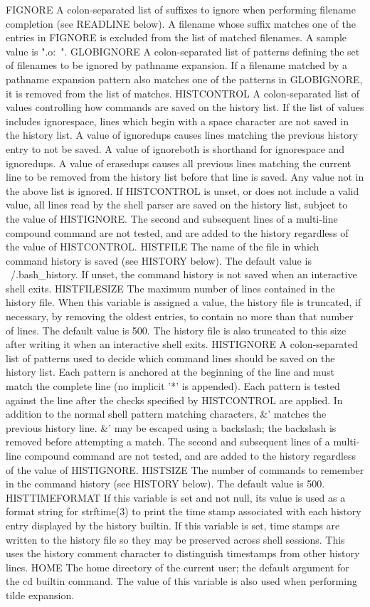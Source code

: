 \documentclass[11pt]{article}
\begin{document}
FIGNORE
A colon-separated list of suffixes to ignore when performing filename completion (see READLINE below). A filename whose suffix matches one of the entries in FIGNORE is excluded from the list of matched filenames. A sample value is ".o:~".
GLOBIGNORE
A colon-separated list of patterns defining the set of filenames to be ignored by pathname expansion. If a filename matched by a pathname expansion pattern also matches one of the patterns in GLOBIGNORE, it is removed from the list of matches.
HISTCONTROL
A colon-separated list of values controlling how commands are saved on the history list. If the list of values includes ignorespace, lines which begin with a space character are not saved in the history list. A value of ignoredups causes lines matching the previous history entry to not be saved. A value of ignoreboth is shorthand for ignorespace and ignoredups. A value of erasedups causes all previous lines matching the current line to be removed from the history list before that line is saved. Any value not in the above list is ignored. If HISTCONTROL is unset, or does not include a valid value, all lines read by the shell parser are saved on the history list, subject to the value of HISTIGNORE. The second and subsequent lines of a multi-line compound command are not tested, and are added to the history regardless of the value of HISTCONTROL.
HISTFILE
The name of the file in which command history is saved (see HISTORY below). The default value is ~/.bash\_history. If unset, the command history is not saved when an interactive shell exits.
HISTFILESIZE
The maximum number of lines contained in the history file. When this variable is assigned a value, the history file is truncated, if necessary, by removing the oldest entries, to contain no more than that number of lines. The default value is 500. The history file is also truncated to this size after writing it when an interactive shell exits.
HISTIGNORE
A colon-separated list of patterns used to decide which command lines should be saved on the history list. Each pattern is anchored at the beginning of the line and must match the complete line (no implicit '*' is appended). Each pattern is tested against the line after the checks specified by HISTCONTROL are applied. In addition to the normal shell pattern matching characters, \&' matches the previous history line. \&' may be escaped using a backslash; the backslash is removed before attempting a match. The second and subsequent lines of a multi-line compound command are not tested, and are added to the history regardless of the value of HISTIGNORE.
HISTSIZE
The number of commands to remember in the command history (see HISTORY below). The default value is 500.
HISTTIMEFORMAT
If this variable is set and not null, its value is used as a format string for strftime(3) to print the time stamp associated with each history entry displayed by the history builtin. If this variable is set, time stamps are written to the history file so they may be preserved across shell sessions. This uses the history comment character to distinguish timestamps from other history lines.
HOME
The home directory of the current user; the default argument for the cd builtin command. The value of this variable is also used when performing tilde expansion.
\end{document}
